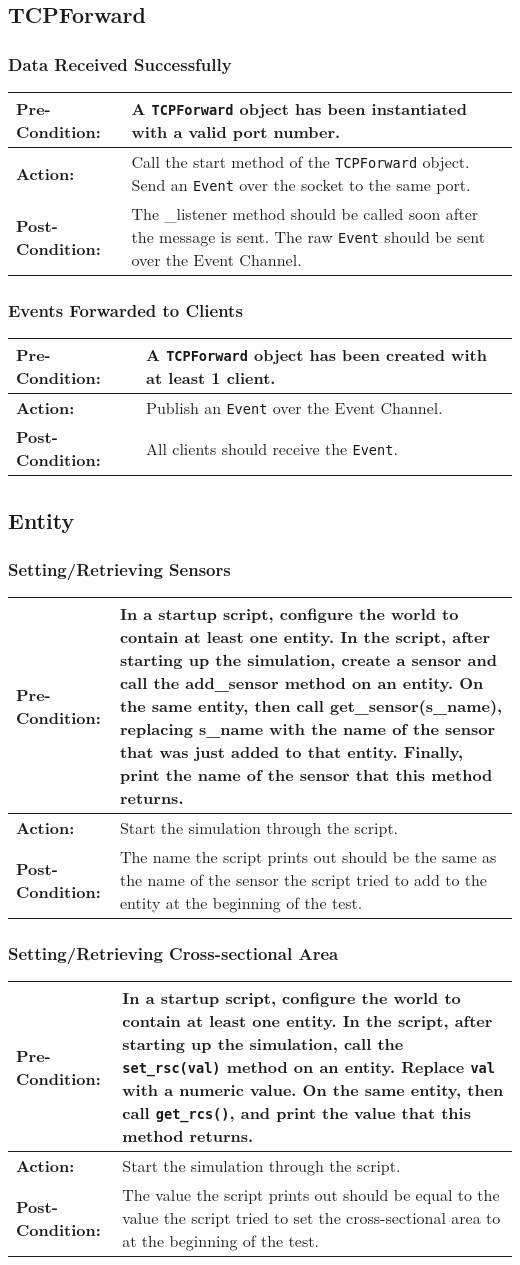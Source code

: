 \documentclass[titlepage]{article}
\newcommand{\testcase}[3]{
    \begin{center}
    \begin{tabular}{| l | p{0.7\textwidth}|}
        \hline
        \rowcolor[gray]{0.8}\textbf{Pre-Condition:} & #1 \\ \hline
        \textbf{Action:} & #2 \\ \hline
        \rowcolor[gray]{0.8}\textbf{Post-Condition:} & #3 \\ \hline
    \end{tabular}
    \end{center}
}
\begin{document}
\subsection{TCPForward}
\subsubsection{Data Received Successfully}
\testcase{A \texttt{TCPForward} object has been instantiated with a valid port number.}{Call the start method of the
\texttt{TCPForward} object. Send an \texttt{Event} over the socket to the same port. }{The \_listener method should be called soon
after the message is sent. The raw \texttt{Event} should be sent over the Event Channel. }

\subsubsection{Events Forwarded to Clients}
\testcase{A \texttt{TCPForward} object has been created with at least 1 client.}{Publish an \texttt{Event} over the
Event Channel.}{All clients should receive the \texttt{Event}.}

\subsection{Entity}
\subsubsection{Setting/Retrieving Sensors}
\testcase{In a startup script, configure the world to contain at least one entity. In the script, after starting up the
simulation, create a sensor and call the add\_sensor method on an entity.  On the same entity, then call
get\_sensor(s\_name), replacing s\_name with the name of the sensor that was just added to that entity.  Finally, print the name of the sensor that this method returns.}{Start the simulation through the script.}{The name the script prints out should be the same as the name of the sensor the script tried to add to the entity at the beginning of the test.}

\subsubsection{Setting/Retrieving Cross-sectional Area}
\testcase{In a startup script, configure the world to contain at least one entity. In the script, after starting up the
simulation, call the \texttt{set\_rsc(val)} method on an entity. Replace \texttt{val} with a numeric value. On the same entity, then call
\texttt{get\_rcs()}, and print the value that this method returns.}{Start the simulation through the script.}{The value the script prints out should be equal to the value the script tried to set the cross-sectional area to at the beginning of the test.}
\end{document}
